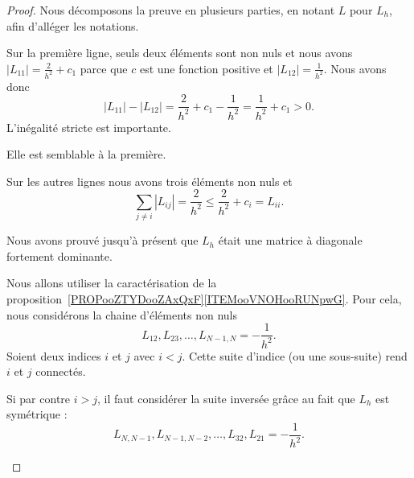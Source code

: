 \begin{proof}
	Nous décomposons la preuve en plusieurs parties, en notant \( L\) pour \( L_h\), afin d'alléger les notations.
	\begin{subproof}
		Sur la première ligne, seuls deux éléments sont non nuls et nous avons \( | L_{11} |=\frac{ 2 }{ h^2 }+c_1\) parce que \( c\) est une fonction positive et \( | L_{12}|=\frac{1}{ h^2 }\). Nous avons donc
		\begin{equation}
			| L_{11} |-| L_{12} |=\frac{ 2 }{ h^2 }+c_1-\frac{1}{ h^2 }=\frac{1}{ h^2 }+c_1>0.
		\end{equation}
		L'inégalité stricte est importante.

		Elle est semblable à la première.

		Sur les autres lignes nous avons trois éléments non nuls et
		\begin{equation}
			\sum_{j\neq i}| L_{ij} |=\frac{ 2 }{ h^2 }\leq \frac{ 2 }{ h^2 }+c_i=L_{ii}.
		\end{equation}

		Nous avons prouvé jusqu'à présent que \( L_h\) était une matrice à diagonale fortement dominante.

		\spitem[Irréductible]
		Nous allons utiliser la caractérisation de la proposition~\ref{PROPooZTYDooZAxQxF}\ref{ITEMooVNOHooRUNpwG}. Pour cela, nous considérons la chaine d'éléments non nuls
		\begin{equation}
			L_{12}, L_{23},\ldots, L_{N-1,N}=-\frac{1}{ h^2 }.
		\end{equation}
		Soient deux indices \( i\) et \( j\) avec \( i<j\). Cette suite d'indice (ou une sous-suite) rend \( i\) et \( j\) connectés.

		Si par contre \( i>j\), il faut considérer la suite inversée grâce au fait que \( L_h\) est symétrique :
		\begin{equation}
			L_{N,N-1},L_{N-1,N-2},\ldots, L_{32}, L_{21}=-\frac{ 1 }{ h^2 }.
		\end{equation}
	\end{subproof}
\end{proof}

